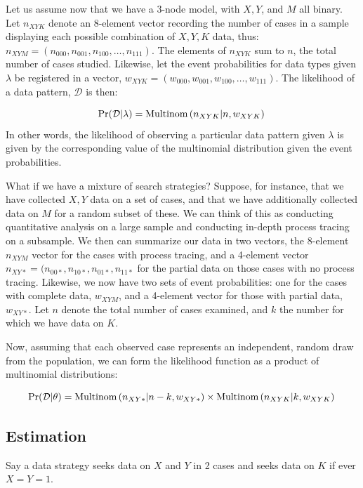 \documentclass[12pt,]{book}
\begin{document}
Let us assume now that we have a 3-node model, with \(X, Y\), and \(M\) all binary. Let \(n_{XYK}\) denote an 8-element vector recording the number of cases in a sample displaying each possible combination of \(X,Y,K\) data, thus: \(n_{XYM}=(n_{000},n_{001},n_{100},\dots ,n_{111})\). The elements of \(n_{XYK}\) sum to \(n\), the total number of cases studied. Likewise, let the event probabilities for data types given \(\lambda\) be registered in a vector, \(w_{XYK}=(w_{000},w_{001},w_{100},\dots ,w_{111})\). The likelihood of a data pattern, \(\mathcal D\) is then:

\[
\Pr(\mathcal{D}|\lambda) = 
  \text{Multinom}\left(n_{XYK}|n, w_{XYK}\right)  \\
\]
In other words, the likelihood of observing a particular data pattern given \(\lambda\) is given by the corresponding value of the multinomial distribution given the event probabilities.

What if we have a mixture of search strategies? Suppose, for instance, that we have collected \(X,Y\) data on a set of cases, and that we have additionally collected data on \(M\) for a random subset of these. We can think of this as conducting quantitative analysis on a large sample and conducting in-depth process tracing on a subsample. We then can summarize our data in two vectors, the 8-element \(n_{XYM}\) vector for the cases with process tracing, and a 4-element vector \(n_{XY*} = (n_{00*},n_{10*},n_{01*},n_{11*}\) for the partial data on those cases with no process tracing. Likewise, we now have two sets of event probabilities: one for the cases with complete data, \(w_{XYM}\), and a 4-element vector for those with partial data, \(w_{XY*}\). Let \(n\) denote the total number of cases examined, and \(k\) the number for which we have data on \(K\).

Now, assuming that each observed case represents an independent, random draw from the population, we can form the likelihood function as a product of multinomial distributions:

\[
\Pr(\mathcal{D}|\theta) = 
  \text{Multinom}\left(n_{XY*}|n-k, w_{XY*}\right) \times \text{Multinom}\left(n_{XYK}|k, w_{XYK}\right)  \\
\]

\hypertarget{estimation}{%
\subsection{Estimation}\label{estimation}}

Say a data strategy seeks data on \(X\) and \(Y\) in 2 cases and seeks data on \(K\) if ever \(X=Y=1\).
\end{document}
